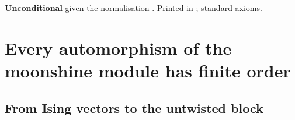 \begin{status}
\textbf{Unconditional} given the normalisation .  Printed in ;
standard axioms.
\end{status}

\section{Every automorphism of the moonshine module has finite order}\label{ch20:sec:finorder}

\subsection{From Ising vectors to the untwisted block}

